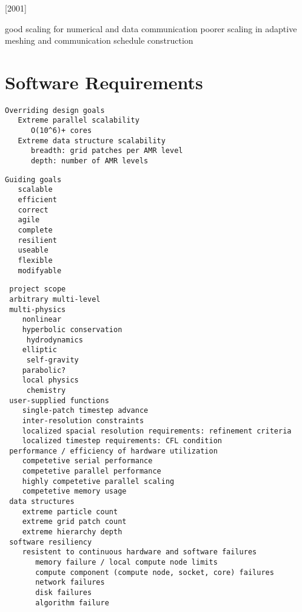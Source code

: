 \documentclass[14pt,letter]{article}
\begin{document}
\subsubsection{} \label{sss:samrai}

[2001]

good scaling for numerical and data communication
poorer scaling in adaptive meshing and communication schedule construction 


\section{Software Requirements} \label{s:requirements}

\begin{verbatim}
Overriding design goals
   Extreme parallel scalability
      O(10^6)+ cores
   Extreme data structure scalability
      breadth: grid patches per AMR level
      depth: number of AMR levels
\end{verbatim}

\begin{verbatim}
Guiding goals
   scalable
   efficient
   correct
   agile
   complete
   resilient
   useable
   flexible
   modifyable
\end{verbatim}

\begin{verbatim}
 project scope
 arbitrary multi-level
 multi-physics
    nonlinear
    hyperbolic conservation
     hydrodynamics
    elliptic
     self-gravity
    parabolic?
    local physics
     chemistry
 user-supplied functions
    single-patch timestep advance
    inter-resolution constraints
    localized spacial resolution requirements: refinement criteria
    localized timestep requirements: CFL condition
 performance / efficiency of hardware utilization
    competetive serial performance
    competetive parallel performance
    highly competetive parallel scaling
    competetive memory usage
 data structures
    extreme particle count
    extreme grid patch count
    extreme hierarchy depth
 software resiliency
    resistent to continuous hardware and software failures
       memory failure / local compute node limits
       compute component (compute node, socket, core) failures
       network failures
       disk failures
       algorithm failure
\end{verbatim}
\end{document}
